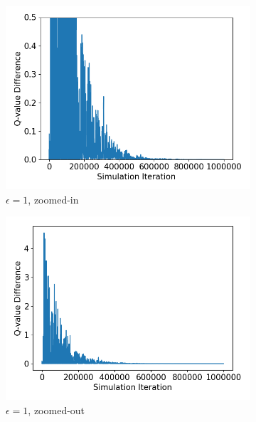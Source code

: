 \documentclass[10pt]{article}
\begin{document}
\begin{figure}[H]
  \centering
  \begin{subfigure}[b]{0.245\linewidth}
  \centering
  \includegraphics[width=\linewidth]{../figs/foeQ_2Q_09_1_1_1000000_replot.png}
      \caption{$\epsilon=1$, zoomed-in}
  \label{fig:foeQ_2Q_cut}
  \end{subfigure}
  \begin{subfigure}[b]{0.245\linewidth}
  \centering
  \includegraphics[width=\linewidth]{../figs/foeQ_2Q_09_1_1_1000000.png}
      \caption{$\epsilon=1$, zoomed-out}
  \label{fig:foeQ_2Q_uncut}
  \end{subfigure}
  \begin{subfigure}[b]{0.245\linewidth}

\end{subfigure}
\end{figure}
\end{document}
